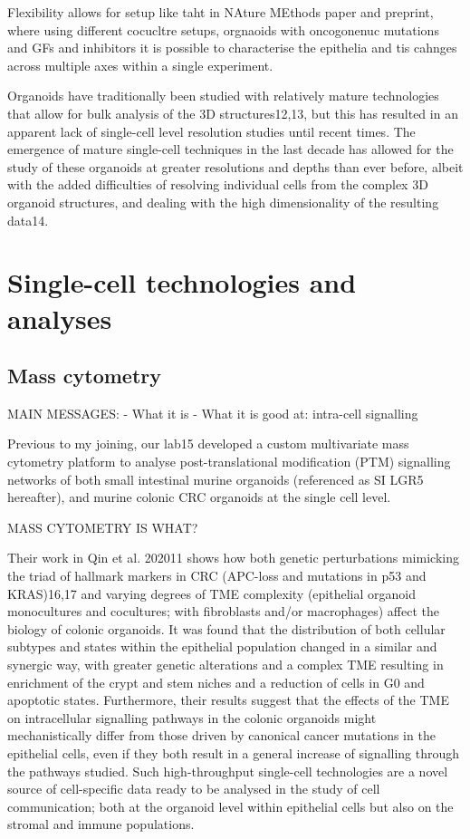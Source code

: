 Flexibility allows for setup like taht in NAture MEthods paper and preprint, where using different cocucltre setups, orgnaoids with oncogonenuc mutations and GFs and inhibitors it is possible to characterise the epithelia and tis cahnges across multiple axes within a single experiment.

Organoids have traditionally been studied with relatively mature technologies that allow for bulk analysis of the 3D structures12,13, but this has resulted in an apparent lack of single-cell level resolution studies until recent times. The emergence of mature single-cell techniques in the last decade has allowed for the study of these organoids at greater resolutions and depths than ever before, albeit with the added difficulties of resolving individual cells from the complex 3D organoid structures, and dealing with the high dimensionality of the resulting data14. 

\section{Single-cell technologies and analyses}

\subsection{Mass cytometry}

MAIN MESSAGES:
- What it is
- What it is good at: intra-cell signalling

Previous to my joining, our lab15 developed a custom multivariate mass cytometry platform to analyse post-translational modification (PTM) signalling networks of both small intestinal murine organoids (referenced as SI LGR5 hereafter), and murine colonic CRC organoids at the single cell level.

MASS CYTOMETRY IS WHAT?

Their work in Qin et al. 202011 shows how both genetic perturbations mimicking the triad of hallmark markers in CRC (APC-loss and mutations in p53 and KRAS)16,17 and varying degrees of TME complexity (epithelial organoid monocultures and cocultures; with fibroblasts and/or macrophages) affect the biology of colonic organoids. It was found that the distribution of both cellular subtypes and states within the epithelial population changed in a similar and synergic way, with greater genetic alterations and a complex TME resulting in enrichment of the crypt and stem niches and a reduction of cells in G0 and apoptotic states. Furthermore, their results suggest that the effects of the TME on intracellular signalling pathways in the colonic organoids might mechanistically differ from those driven by canonical cancer mutations in the epithelial cells, even if they both result in a general increase of signalling through the pathways studied. Such high-throughput single-cell technologies are a novel source of cell-specific data ready to be analysed in the study of cell communication; both at the organoid level within epithelial cells but also on the stromal and immune populations. 

